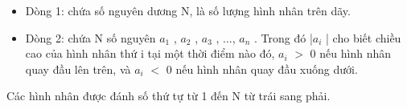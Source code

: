 \begin{itemize}
	\item     Dòng 1: chứa số nguyên dương N, là số lượng hình nhân trên dãy.   
	\item     Dòng 2: chứa N số nguyên $a_{1}$    , $a_{2}$    , $a_{3}$    , ..., $a_{n}$    . Trong đó |$a_{i}$    | cho biết chiều cao của hình nhân thứ i tại một thời điểm nào đó, $a_{i}$    $>$ 0 nếu hình nhân quay đầu lên trên, và $a_{i}$    $<$ 0 nếu hình nhân quay đầu xuống dưới.   
\end{itemize}

   Các hình nhân được đánh số thứ tự từ 1 đến N từ trái sang phải.